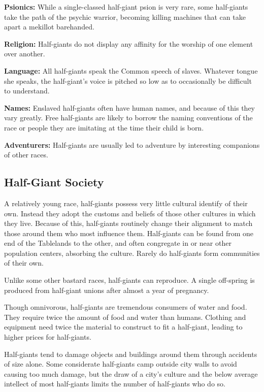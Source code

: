 \textbf{Psionics:} While a single-classed half-giant psion is very rare, some half-giants take the path of the psychic warrior, becoming killing machines that can take apart a mekillot barehanded.

\textbf{Religion:} Half-giants do not display any affinity for the worship of one element over another.

\textbf{Language:} All half-giants speak the Common speech of slaves. Whatever tongue she speaks, the half-giant's voice is pitched so low as to occasionally be difficult to understand.

\textbf{Names:} Enslaved half-giants often have human names, and because of this they vary greatly. Free half-giants are likely to borrow the naming conventions of the race or people they are imitating at the time their child is born.

\textbf{Adventurers:} Half-giants are usually led to adventure by interesting companions of other races.

\subsection{Half-Giant Society}
A relatively young race, half-giants possess very little cultural identify of their own. Instead they adopt the customs and beliefs of those other cultures in which they live. Because of this, half-giants routinely change their alignment to match those around them who most influence them.
Half-giants can be found from one end of the Tablelands to the other, and often congregate in or near other population centers, absorbing the culture. Rarely do half-giants form communities of their own.

Unlike some other bastard races, half-giants can reproduce. A single off-spring is produced from half-giant unions after almost a year of pregnancy.

Though omnivorous, half-giants are tremendous consumers of water and food. They require twice the amount of food and water than humans. Clothing and equipment need twice the material to construct to fit a half-giant, leading to higher prices for half-giants.

Half-giants tend to damage objects and buildings around them through accidents of size alone. Some considerate half-giants camp outside city walls to avoid causing too much damage, but the draw of a city's culture and the below average intellect of most half-giants limits the number of half-giants who do so.

